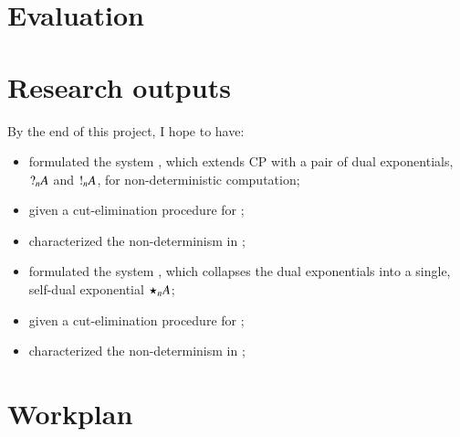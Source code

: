 \documentclass[twocolumn]{article}
\begin{document}
\section{Evaluation}

\section{Research outputs}
By the end of this project, I hope to have:
\begin{itemize}
\renewcommand\labelitemi{--}
\item%
  formulated the system \gtcp, which extends CP with a pair of dual
  exponentials, $\give[n]{A}$ and $\take[n]{A}$, for non-deterministic
  computation; 
\item%
  given a cut-elimination procedure for \gtcp;
\item%
  characterized the non-determinism in \gtcp;
\item%
  formulated the system \ndcp, which collapses the dual exponentials
  into a single, self-dual exponential $\nod[n]{A}$; 
\item%
  given a cut-elimination procedure for \ndcp;
\item%
  characterized the non-determinism in \ndcp;
\end{itemize}

\section{Workplan}



\nocite{*}
\end{document}
